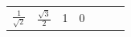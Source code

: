 {\begin{tabular}[t]{|l|l|l|l|l|l|l|}
                  $\frac{1}{\sqrt{2}}$
                 &
                  $\frac{\sqrt{3}}{2}$
                 &
        1 &
        0%
     \tabularnewline\cline{1-1}\cline{2-2}\cline{3-3}\cline{4-4}\cline{5-5}\cline{6-6}\cline{7-7}
    \end{tabular}} %
